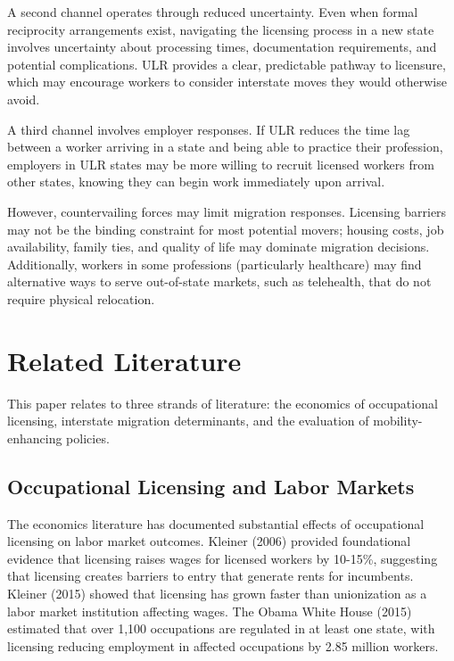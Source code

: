 \documentclass[12pt]{article}
\begin{document}
A second channel operates through reduced uncertainty. Even when formal reciprocity arrangements exist, navigating the licensing process in a new state involves uncertainty about processing times, documentation requirements, and potential complications. ULR provides a clear, predictable pathway to licensure, which may encourage workers to consider interstate moves they would otherwise avoid.

A third channel involves employer responses. If ULR reduces the time lag between a worker arriving in a state and being able to practice their profession, employers in ULR states may be more willing to recruit licensed workers from other states, knowing they can begin work immediately upon arrival.

However, countervailing forces may limit migration responses. Licensing barriers may not be the binding constraint for most potential movers; housing costs, job availability, family ties, and quality of life may dominate migration decisions. Additionally, workers in some professions (particularly healthcare) may find alternative ways to serve out-of-state markets, such as telehealth, that do not require physical relocation.

\section{Related Literature}

This paper relates to three strands of literature: the economics of occupational licensing, interstate migration determinants, and the evaluation of mobility-enhancing policies.

\subsection{Occupational Licensing and Labor Markets}

The economics literature has documented substantial effects of occupational licensing on labor market outcomes. Kleiner (2006) provided foundational evidence that licensing raises wages for licensed workers by 10-15\%, suggesting that licensing creates barriers to entry that generate rents for incumbents. Kleiner (2015) showed that licensing has grown faster than unionization as a labor market institution affecting wages. The Obama White House (2015) estimated that over 1,100 occupations are regulated in at least one state, with licensing reducing employment in affected occupations by 2.85 million workers.
\end{document}
